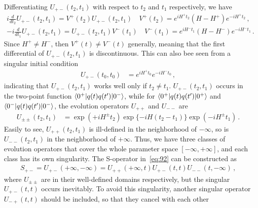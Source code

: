 \documentclass[12pt,a4paper]{article}
\begin{document}
Differentiating $U_{+-}(t_2,t_1)$ with respect to $t_2$ and $t_1$ respectively, we have
\begin{subequations}\label{eq:94}
\begin{align}
\label{eq:94:1}
i\frac{d}{dt_{2}}U_{+-}(t_2,t_1)=V^+(t_2)U_{+-}(t_2,t_1)\quad
V^+(t_2)=e^{iH^+t_2}(H-H^+)e^{-iH^+t_2}\,,
\\
\label{eq:94:2}
-i\frac{d}{dt_{1}}U_{+-}(t_2,t_1)=U_{+-}(t_2,t_1)V^-(t_1)\quad
V^-(t_1)=e^{iH^-t_1}(H-H^-)e^{-iH^-t_1}\,.
\end{align}
\end{subequations}
Since $H^+\neq H^-$, then $V^+(t)\neq  V^-(t)$ generally, meaning that the first differential of
$U_{+-}(t_2,t_1)$ is discontinuous. This can also bee seen from a singular initial condition
\begin{equation}
\label{eq:95}
\begin{split}
U_{+-}(t_0,t_0) &= e^{iH^+t_0}e^{-iH^-t_0} \,,
\end{split}
\end{equation}
indicating that $U_{+-}(t_2,t_1)$ works well only if $t_2\neq t_1$. $U_{+-}(t_2,t_1)$ occurs in the two-point
function $\langle0^+\arrowvert q(t)q(t')\arrowvert0^-\rangle$, while
for $\langle0^+\arrowvert q(t)q(t')\arrowvert0^+\rangle$ and
$\langle0^-\arrowvert q(t)q(t')\arrowvert0^-\rangle$, the evolution
operators $U_{++}$ and $U_{--}$ are
\begin{equation}
\label{eq:96}
\begin{split}
U_{\pm\pm}(t_2,t_1) &= \exp(+i H^{\pm} t_2)\exp\{-i
H(t_2-t_1)\}\exp(-i H^{\pm}t_1) \,.
\end{split}
\end{equation}
Easily to see, $U_{++}(t_2,t_1)$ is ill-defined in the neighborhood
of $-\infty$, so is $U_{--}(t_2,t_1)$ in the
neighborhood of $+\infty$. Thus, we have three classes of
evolution operators that cover the whole parameter space $[-\infty,+\infty]$, and
each class has its own singularity.
The S-operator in~\eqref{eq:92} can be constructed as
\begin{equation}
\label{eq:97}
\begin{split}
S_{+-}=U_{+-}(+\infty,-\infty)=U_{++}(+\infty,t)U_{+-}(t,t)U_{--}(t,-\infty)\,,
\end{split}
\end{equation}
where $U_{\pm\pm}$ are in their well-defined domains
respectively, but the singular $U_{+-}(t,t)$ occurs inevitably.
To avoid this singularity, another singular operator $U_{-+}(t,t)$
should be included, so that they cancel with each other
\end{document}

